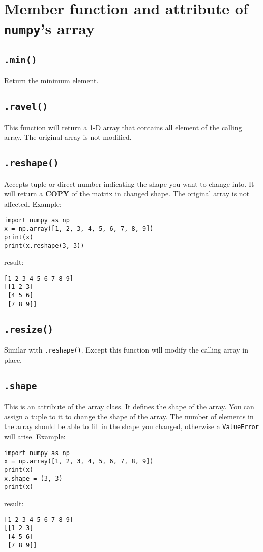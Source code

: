 \documentclass[12pt]{book}
\begin{document}
\section{Member function and attribute  of \texttt{numpy}'s array}
\label{sec:orgf4de09e}
\subsection{\texttt{.min()}}
\label{sec:org8515fb2}
Return the minimum element.
\subsection{\texttt{.ravel()}}
\label{sec:orgc76949f}
This function will return a 1-D array that contains all element of the calling array. The original array is not modified.
\subsection{\texttt{.reshape()}}
\label{sec:orgf97fdb9}
Accepts tuple or direct number indicating the shape you want to change into. It will return a \textbf{COPY} of the matrix in changed shape. The original array is not affected. Example:
\begin{verbatim}
import numpy as np
x = np.array([1, 2, 3, 4, 5, 6, 7, 8, 9])
print(x)
print(x.reshape(3, 3))
\end{verbatim}
result:
\begin{verbatim}
[1 2 3 4 5 6 7 8 9]
[[1 2 3]
 [4 5 6]
 [7 8 9]]
\end{verbatim}
\subsection{\texttt{.resize()}}
\label{sec:org2c33db3}
Similar with \texttt{.reshape()}. Except this function will modify the calling array in place.
\subsection{\texttt{.shape}}
\label{sec:org6dae002}
This is an attribute of the array class. It defines the shape of the array. You can assign a tuple to it to change the shape of the array. The number of elements in the array should be able to fill in the shape you changed, otherwise a \texttt{ValueError} will arise. Example:
\begin{verbatim}
import numpy as np
x = np.array([1, 2, 3, 4, 5, 6, 7, 8, 9])
print(x)
x.shape = (3, 3)
print(x)
\end{verbatim}
result:
\begin{verbatim}
[1 2 3 4 5 6 7 8 9]
[[1 2 3]
 [4 5 6]
 [7 8 9]]
\end{verbatim}
\end{document}
